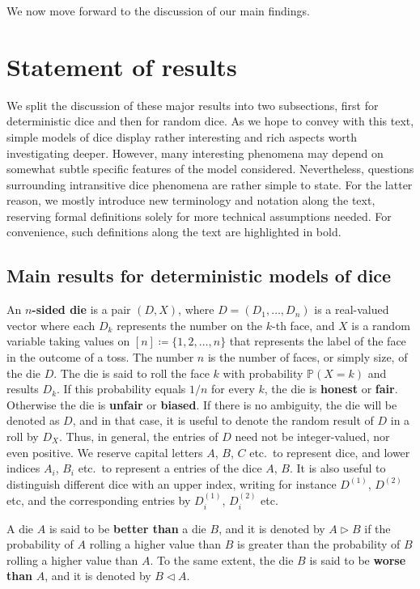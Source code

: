 \documentclass[reqno,a4paper,11pt]{amsart}
\newcommand{\prob}[1]{\mathbb{P}(#1)}
\newcommand{\btt}{\triangleright}
\newcommand{\wst}{\triangleleft}
\theoremstyle{remark}
\numberwithin{equation}{section}
\begin{document}
We now move forward to the discussion of our main findings.

\section{Statement of results}\label{s:statements}

We split the discussion of these major results into two subsections, first for deterministic dice and then for random dice.
As we hope to convey with this text, simple models of dice display rather interesting and rich aspects worth investigating deeper. However, many interesting phenomena may depend on somewhat subtle specific features of the model considered. Nevertheless, questions surrounding intransitive dice phenomena are rather simple to state. For the latter reason, we mostly introduce new terminology and notation along the text, reserving formal definitions solely for more technical assumptions needed. For convenience, such definitions along the text are highlighted in bold.

\subsection{Main results for deterministic models of dice}\label{sec:determdice}
\hfill

An $n$\textbf{-sided die} is a pair $(D,X)$, where $D=(D_1,\hdots, D_n)$ is a real-valued vector where each $D_k$ represents the number on the $k$-th face, and $X$ is a random variable taking values on $[n] \coloneqq\{1, 2, \hdots, n\}$ that represents the label of the face in the outcome of a toss. The number $n$ is the number of faces, or simply size, of the die $D$.
The die is said to roll the face $k$ with probability $\prob{X=k}$ and results $D_k$. If this probability equals $1/n$ for every $k$, the
die is \textbf{honest} or \textbf{fair}. Otherwise the die is \textbf{unfair} or \textbf{biased}. If there is no ambiguity, the die will be denoted as $D$, and in that case, it is
useful to denote the random result of $D$ in a roll by $D_X$. Thus, in general, the entries of $D$ need not be integer-valued, nor even positive. We reserve capital letters $A$, $B$, $C$ etc.\ to represent dice, and lower indices $A_i$, $B_i$ etc.\ to represent a entries of the dice $A$, $B$. It is also useful to distinguish different dice with an upper index, writing for instance $D^{(1)}$, $D^{(2)}$ etc, and the corresponding entries by $D^{(1)}_i$, $D^{(2)}_i$ etc.

A die \(A\) is said to be {\bfseries better than} a die \(B\), and it is
denoted by \(A \btt B\) if the probability of \(A\) rolling a higher value than
\(B\) is greater than the probability of \(B\) rolling a higher value than
\(A\). To the same extent, the die \(B\) is said to be {\bfseries worse than}
\(A\), and it is denoted by \(B\wst A\).
\end{document}
